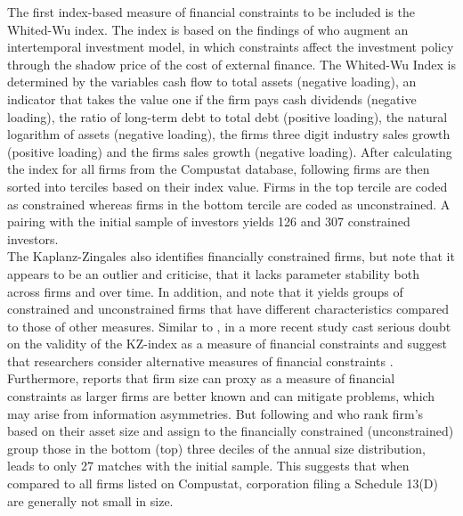 \documentclass[12pt]{article}
\begin{document}
The first index-based measure of financial constraints to be included is the Whited-Wu index. The index is based on the findings of \citet[p.543]{Whited2006} who augment an intertemporal investment model, in which constraints affect the investment policy through the shadow price of the cost of external finance. The Whited-Wu Index is determined by the variables cash flow to total assets (negative loading), an indicator that takes the value one if the firm pays cash dividends (negative loading), the ratio of long-term debt to total debt (positive loading), the natural logarithm of assets (negative loading), the firms three digit industry sales growth (positive loading) and the firms sales growth (negative loading). After calculating the index for all firms from the Compustat database, following \citet[p.38]{Farre-mensa2013} firms are then sorted into terciles based on their index value. Firms in the top tercile are coded as constrained whereas firms in the bottom tercile are coded as unconstrained. A pairing with the initial sample of investors yields 126 and 307 constrained investors.\\
The Kaplanz-Zingales also identifies financially constrained firms, but \citet[p.29]{Farre-mensa2013} note that it appears to be an outlier and \citet{Whited2006} criticise, that it lacks parameter stability both across firms and over time. In addition, \citet[p.111]{Khatami2014} and \citet[p.1779]{Almeida2004} note that it yields groups of constrained and unconstrained firms that have different characteristics compared to those of other measures. Similar to \citet[p.546]{Whited2006}, in a more recent study \citet[p.1909]{hadlock2010} cast serious doubt on the validity of the KZ-index as a measure of financial constraints and suggest that researchers consider alternative measures of financial constraints \citep[p.1938]{hadlock2010}.\\
Furthermore, \citet[p.15]{heller2015} reports that firm size can proxy as a measure of financial constraints as larger firms are better known and can mitigate problems, which may arise from information asymmetries. But following \citet[p.1790]{Almeida2004} and \citet[p.215]{Moeller2004} who rank firm's based on their asset size and assign to the financially constrained (unconstrained) group those in the bottom (top) three deciles of the annual size distribution, leads to only 27 matches with the initial sample. This suggests that when compared to all firms listed on Compustat, corporation filing a Schedule 13(D) are generally not small in size. 
\end{document}
